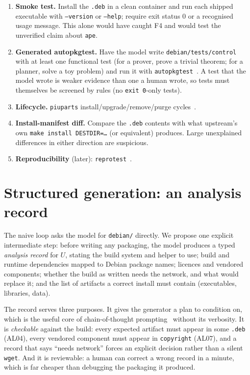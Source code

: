 \documentclass[11pt]{article}
\newcommand{\pkg}[1]{\texttt{#1}}
\newcommand{\file}[1]{\texttt{#1}}
\begin{document}
\begin{enumerate}[leftmargin=1.5em]
\item \textbf{Smoke test.} Install the \file{.deb} in a clean container and
  run each shipped executable with \texttt{--version} or \texttt{--help};
  require exit status 0 or a recognised usage message. This alone would
  have caught F4 and would test the unverified claim about \pkg{ape}.
\item \textbf{Generated autopkgtest.} Have the model write
  \file{debian/tests/control} with at least one functional test (for a
  prover, prove a trivial theorem; for a planner, solve a toy problem) and
  run it with \texttt{autopkgtest}~\cite{autopkgtest}. A test that the
  model wrote is weaker evidence than one a human wrote, so tests must
  themselves be screened by rules (no \texttt{exit 0}-only tests).
\item \textbf{Lifecycle.} \texttt{piuparts} install/upgrade/remove/purge
  cycles~\cite{piuparts}.
\item \textbf{Install-manifest diff.} Compare the \file{.deb} contents with
  what upstream's own \texttt{make install DESTDIR=\ldots} (or equivalent)
  produces. Large unexplained differences in either direction are
  suspicious.
\item \textbf{Reproducibility} (later): \texttt{reprotest}~\cite{reprotest}.
\end{enumerate}

\section{Structured generation: an analysis record}
\label{sec:analysis}

The naive loop asks the model for \file{debian/} directly. We propose one
explicit intermediate step: before writing any packaging, the model
produces a typed \emph{analysis record} for $U$, stating the build system
and helper to use; build and runtime dependencies mapped to Debian package
names; licences and vendored components; whether the build as written needs
the network, and what would replace it; and the list of artifacts a correct
install must contain (executables, libraries, data).

The record serves three purposes. It gives the generator a plan to condition
on, which is the useful core of chain-of-thought prompting~\cite{cot}
without its verbosity. It is \emph{checkable} against the build: every
expected artifact must appear in some \file{.deb} (AL04), every vendored
component must appear in \file{copyright} (AL07), and a record that says
``needs network'' forces an explicit decision rather than a silent
\texttt{wget}. And it is reviewable: a human can correct a wrong record in a
minute, which is far cheaper than debugging the packaging it produced.
\end{document}
